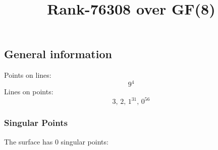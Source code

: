 \documentclass{article}
\newcommand\setTBstruts{\def\T{\rule{0pt}{2.6ex}}%
\def\B{\rule[-1.2ex]{0pt}{0pt}}}
\begin{document}
 
\setTBstruts



{\allowdisplaybreaks%






\title{Rank-76308 over GF(8)}
\author{}%
\maketitle%
%
{}



\subsection*{General information}
Points on lines:
$$
9^4$$
Lines on points:
$$
3,\,2,\,1^{31},\,0^{56}$$
\subsubsection*{Singular Points}
The surface has 0 singular points:\\
\begin{align*}
\end{align*}
}
\end{document}
